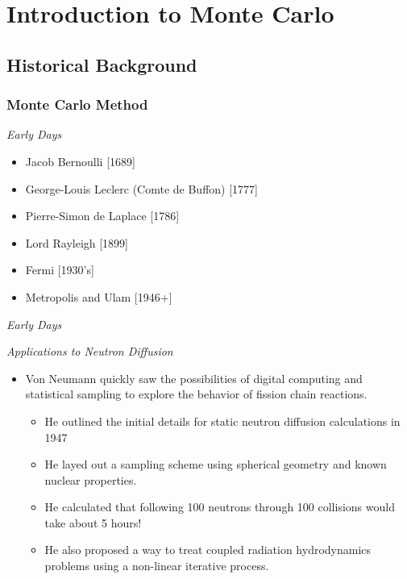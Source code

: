 \chapter{Introduction to Monte Carlo}

\section{Historical Background}

\subsection{Monte Carlo Method}


\emph{Early Days}

  \begin{itemize}
  \item Jacob Bernoulli [1689]
  \item George-Louis Leclerc (Comte de Buffon) [1777]
  \item Pierre-Simon de Laplace [1786]
  \item Lord Rayleigh [1899]
  \item Fermi [1930's]
  \item Metropolis and Ulam [1946+]
  \end{itemize}



\emph{Early Days}

  \begin{figure}[htbp]
    \centering
  \end{figure}



\emph{Applications to Neutron Diffusion}
 \begin{itemize}
  \item Von Neumann quickly saw the possibilities of digital computing and statistical sampling to explore the behavior of fission chain reactions.
  \begin{itemize}
   \item He outlined the initial details for static neutron diffusion calculations in 1947
   \item He layed out a sampling scheme using spherical geometry and known nuclear properties.
   \item He calculated that following 100 neutrons through 100 collisions would take about 5 hours!
   \item He also proposed a way to treat coupled radiation hydrodynamics problems using a non-linear iterative process.
  \end{itemize}
 \end{itemize}


